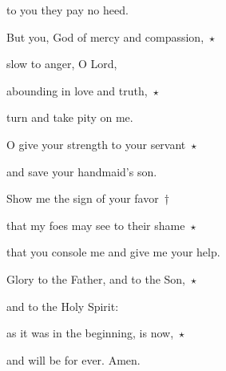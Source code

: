 to you they pay no heed.

\noindent But you, God of mercy and compassion,~$\star$~\nopagebreak

slow to anger, O Lord,

\noindent abounding in love and truth,~$\star$~\nopagebreak

turn and take pity on me.

\noindent O give your strength to your servant~$\star$~\nopagebreak

and save your handmaid’s son.

\noindent Show me the sign of your favor~†~\nopagebreak

that my foes may see to their shame~$\star$~\nopagebreak

that you console me and give me your help.

\noindent Glory to the Father, and to the Son,~$\star$~\nopagebreak

and to the Holy Spirit:

\noindent as it was in the beginning, is now,~$\star$~\nopagebreak

and will be for ever. Amen.
